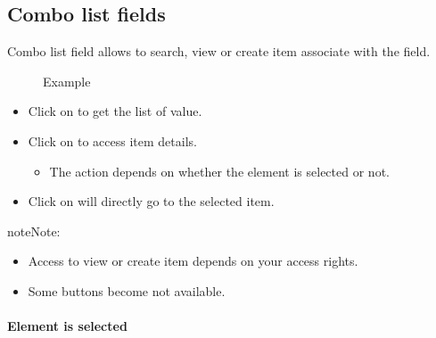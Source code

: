 \documentclass[letterpaper,10pt,english]{sphinxmanual}
\begin{document}
\subsection{Combo list fields}
\label{Gui:combo-list-fields}\label{Gui:gui-combo-list-fields-label}
Combo list field allows to search, view or create item associate with the field.
\begin{figure}[htbp]
\centering
\capstart

\caption{Example}\end{figure}
\begin{itemize}
\item {} 
Click on  to get the list of value.

\item {} 
Click on  to access item details.
\begin{itemize}
\item {} 
The action depends on whether the element is selected or not.

\end{itemize}

\item {} 
Click on  will directly go to the selected item.

\end{itemize}

\begin{notice}{note}{Note:}\begin{itemize}
\item {} 
Access to view or create item depends on your access rights.

\item {} 
Some buttons become not available.

\end{itemize}
\end{notice}
\paragraph{Element is selected}
\end{document}
